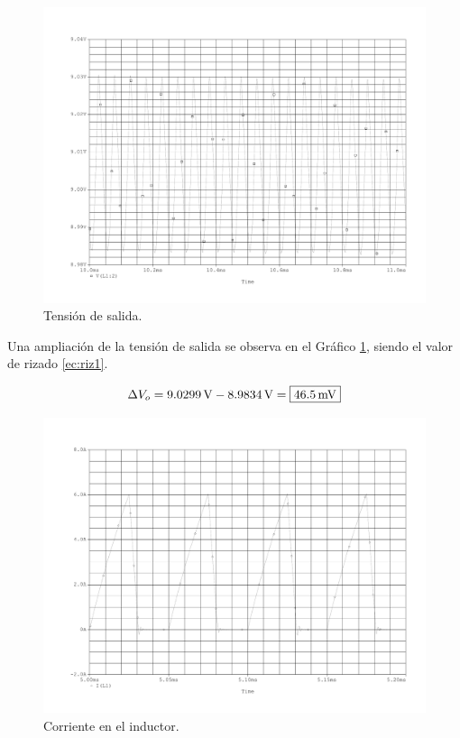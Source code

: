 \begin{figure}[H]
	\centering
	\includegraphics[scale=0.4]{Figuras/ej1_vo_zoom.pdf}
	\caption{Tensión de salida.}
	\label{fig:sim_ej1_vo_zoom}
\end{figure}

Una ampliación de la tensión de salida se observa en el Gráfico \ref{fig:sim_ej1_vo_zoom}, siendo el valor de rizado \eqref{ec:riz1}.

\begin{equation}
	\centering
	\Delta V_o = \SI{9.0299}{\volt} - \SI{8.9834}{\volt} = \boxed{\SI{46.5}{\milli\volt}}
	\label{ec:riz1}
\end{equation}

\begin{figure}[H]
	\centering
	\includegraphics[scale=0.4]{Figuras/ej1_I(L1).pdf}
	\caption{Corriente en el inductor.}
	\label{fig:sim_ej1_il}
\end{figure}

